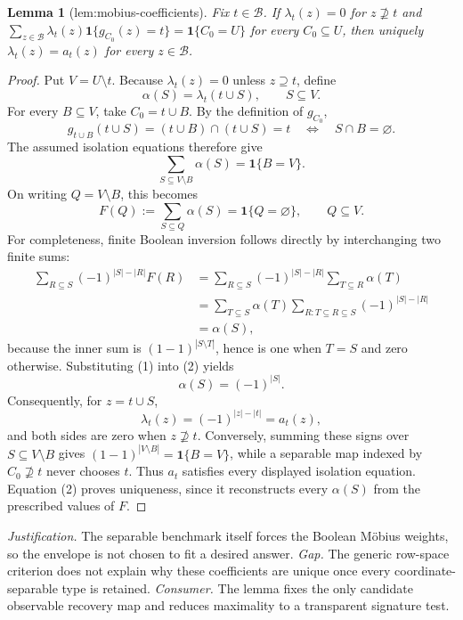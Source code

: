 \documentclass{article}
\newtheorem{lemma}{Lemma}
\begin{document}
\begin{lemma}[lem:mobius-coefficients]\label{lem:mobius-coefficients}
Fix \(t\in\mathcal B\). If \(\lambda_t(z)=0\) for \(z\not\supseteq t\) and \(\sum_{z\in\mathcal B}\lambda_t(z)\mathbf 1\{g_{C_0}(z)=t\}=\mathbf 1\{C_0=U\}\) for every \(C_0\subseteq U\), then uniquely \(\lambda_t(z)=a_t(z)\) for every \(z\in\mathcal B\).
\end{lemma}
\begin{proof}
Put \(V=U\setminus t\).  Because \(\lambda_t(z)=0\) unless \(z\supseteq t\), define
\[
\alpha(S)=\lambda_t(t\cup S),\qquad S\subseteq V.
\]
For every \(B\subseteq V\), take \(C_0=t\cup B\).  By the definition of \(g_{C_0}\),
\[
g_{t\cup B}(t\cup S)=(t\cup B)\cap(t\cup S)=t
\quad\Longleftrightarrow\quad S\cap B=\varnothing.
\]
The assumed isolation equations therefore give
\[
\sum_{S\subseteq V\setminus B}\alpha(S)=\mathbf 1\{B=V\}.
\]
On writing \(Q=V\setminus B\), this becomes
\[
F(Q):=\sum_{S\subseteq Q}\alpha(S)=\mathbf 1\{Q=\varnothing\},
\qquad Q\subseteq V. \tag{1}
\]
For completeness, finite Boolean inversion follows directly by interchanging two finite sums:
\[
\begin{aligned}
\sum_{R\subseteq S}(-1)^{|S|-|R|}F(R)
&=\sum_{R\subseteq S}(-1)^{|S|-|R|}\sum_{T\subseteq R}\alpha(T)\\
&=\sum_{T\subseteq S}\alpha(T)
  \sum_{R:T\subseteq R\subseteq S}(-1)^{|S|-|R|}\\
&=\alpha(S),
\end{aligned} \tag{2}
\]
because the inner sum is \((1-1)^{|S\setminus T|}\), hence is one when \(T=S\) and zero otherwise.  Substituting (1) into (2) yields
\[
\alpha(S)=(-1)^{|S|}.
\]
Consequently, for \(z=t\cup S\),
\[
\lambda_t(z)=(-1)^{|z|-|t|}=a_t(z),
\]
and both sides are zero when \(z\not\supseteq t\).  Conversely, summing these signs over \(S\subseteq V\setminus B\) gives \((1-1)^{|V\setminus B|}=\mathbf 1\{B=V\}\), while a separable map indexed by \(C_0\not\supseteq t\) never chooses \(t\).  Thus \(a_t\) satisfies every displayed isolation equation.  Equation (2) proves uniqueness, since it reconstructs every \(\alpha(S)\) from the prescribed values of \(F\).
\end{proof}
\par\smallskip\noindent \textit{Justification.} The separable benchmark itself forces the Boolean Möbius weights, so the envelope is not chosen to fit a desired answer. \textit{Gap.} The generic row-space criterion does not explain why these coefficients are unique once every coordinate-separable type is retained. \textit{Consumer.} The lemma fixes the only candidate observable recovery map and reduces maximality to a transparent signature test.
\end{document}
